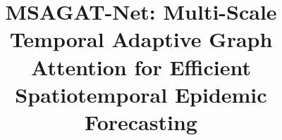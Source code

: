 \documentclass[final,1p,times]{elsarticle}
\makeatletter
\let\cortext\@gobble%
\makeatother
\begin{document}
\begin{frontmatter}




\title{MSAGAT-Net: Multi-Scale Temporal Adaptive Graph Attention for Efficient Spatiotemporal Epidemic Forecasting}







\end{frontmatter}
\end{document}
